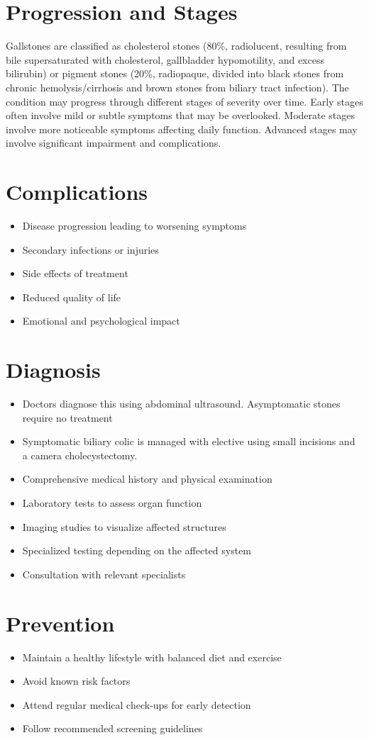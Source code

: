 \section{Progression and Stages}
Gallstones are classified as cholesterol stones (80\%, radiolucent, resulting from bile supersaturated with cholesterol, gallbladder hypomotility, and excess bilirubin) or pigment stones (20\%, radiopaque, divided into black stones from chronic hemolysis/cirrhosis and brown stones from biliary tract infection). The condition may progress through different stages of severity over time. Early stages often involve mild or subtle symptoms that may be overlooked. Moderate stages involve more noticeable symptoms affecting daily function. Advanced stages may involve significant impairment and complications.
\section{Complications}
\begin{itemize}[noitemsep]
  \item Disease progression leading to worsening symptoms
  \item Secondary infections or injuries
  \item Side effects of treatment
  \item Reduced quality of life
  \item Emotional and psychological impact
\end{itemize}
\section{Diagnosis}
\begin{itemize}[noitemsep]
  \item Doctors diagnose this using abdominal ultrasound. Asymptomatic stones require no treatment
  \item Symptomatic biliary colic is managed with elective using small incisions and a camera cholecystectomy.
  \item Comprehensive medical history and physical examination
  \item Laboratory tests to assess organ function
  \item Imaging studies to visualize affected structures
  \item Specialized testing depending on the affected system
  \item Consultation with relevant specialists
\end{itemize}
\section{Prevention}
\begin{itemize}[noitemsep]
  \item Maintain a healthy lifestyle with balanced diet and exercise
  \item Avoid known risk factors
  \item Attend regular medical check-ups for early detection
  \item Follow recommended screening guidelines
\end{itemize}
